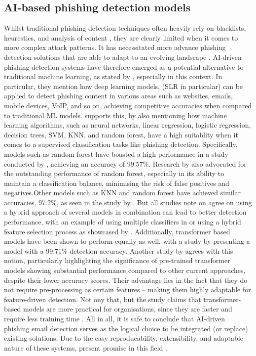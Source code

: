 \subsection*{AI-based phishing detection models}

Whilst traditional phishing detection techniques often heavily rely on blacklists, heurestics, and analysis of content \citep{sheng2009empirical}, they are clearly limited when it comes to more complex attack patterns. It has necessitated more advance phishing detection solutions that are able to adapt to an evolving landscape \citep{andriu2023adaptive}. AI-driven phishing detection systems have therefore emerged as a potential alternative to traditional machine learning, as stated by \cite{do2022deep}, especially in this context. In particular, they mention how deep learning models, (SLR in particular) can be applied to detect phishing content in various areas such as websites, emails, mobile devices, VoIP, and so on, achieving competitive accuracies when compared to traditional ML models. \cite{tang2021survey} supports this, by also mentioning how machine learning algorithms, such as neural networks, linear regression, logistic regression, decision trees, SVM, KNN, and random forest, have a high suitablity when it comes to a supervised classification tasks like phishing detection. Specifically, models such as random forest have boasted a high performance in a study conducted by \cite{gupta2021novel}, achieving an accuracy of 99.57\%. Research by \citep{kapoor2024comparative} also advocated for the outstanding performance of random forest, especially in its ability to maintain a classification balance, minimising the risk of false positives and negatives.Other models such as KNN and random forest have achieved similar accuracies, 97.2\%, as seen in the study by \cite{zamir2020phishing}. But all studies note on agree on using a hybrid approach of several models in combination can lead to better detection performance, with an example of using multiple classifiers in \cite{alsariera2020ai} or using a hybrid feature selection process as showcased by \cite{hamid2013using}. Additionally, transformer based models have been shown to perform equally as well, with a study by \cite{do2024integrated} presenting a model with a 99.71\% detection accuracy. Another study by \cite{shirazi2022towards} agrees with this notion, particularly highlighting the significance of pre-trained transformer models showing substantial performance compared to other current approaches, despite their lower accuracy scores. Their advantage lies in the fact that they do not require pre-processing as certain features -- making them highly adaptable for feature-driven detection. Not ony that, but the study claims that transformer-based models are more practical for organisations, since they are faster and require less training time \citep{shirazi2022towards}. All in all, it is safe to conclude that AI-driven phishing email detection serves as the logical choice to be integrated (or replace) existing solutions. Due to the easy reproducability, extensibility, and adaptable nature of these systems, present promise in this field \citep{bauskar2024ai}.


